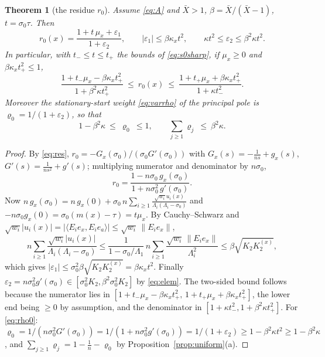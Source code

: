 \documentclass[11pt,a4paper]{article}
\newcommand{\ip}[2]{\langle #1,#2\rangle}
\newcommand{\Xb}{\bar X}
\theoremstyle{plain}
\newtheorem{theorem}{Theorem}[section]
\theoremstyle{definition}
\numberwithin{equation}{section}
\begin{document}
\begin{theorem}[the residue $r_0$]\label{thm:r0}
Assume \eqref{eq:A} and $\Xb>1$, $\beta=\Xb/(\Xb-1)$, $t=\sigma_0\tau$. Then
\begin{equation}\label{eq:r0}
r_0(x)=\frac{1+t\,\mu_x+\varepsilon_1}{1+\varepsilon_2},\qquad|\varepsilon_1|\le\beta\kappa_xt^2,\qquad\kappa t^2\le\varepsilon_2\le\beta^2\kappa t^2 .
\end{equation}
In particular, with $t_-\le t\le t_+$ the bounds of \eqref{eq:s0sharp}, if $\mu_x\ge0$ and $\beta\kappa_xt_+^2\le1$,
\[
\frac{1+t_-\mu_x-\beta\kappa_xt_+^2}{1+\beta^2\kappa t_+^2}\ \le\ r_0(x)\ \le\ \frac{1+t_+\mu_x+\beta\kappa_xt_+^2}{1+\kappa t_-^2} .
\]
Moreover the stationary-start weight \eqref{eq:varrho} of the principal pole is $\varrho_0=1/(1+\varepsilon_2)$, so that
\begin{equation}\label{eq:rho0}
1-\beta^2\kappa\ \le\ \varrho_0\ \le 1,\qquad \sum_{j\ge1}\varrho_j\ \le\ \beta^2\kappa .
\end{equation}
\end{theorem}
\begin{proof}
By \eqref{eq:res}, $r_0=-G_x(\sigma_0)/(\sigma_0G'(\sigma_0))$ with $G_x(s)=-\frac1{ns}+g_x(s)$, $G'(s)=\frac1{ns^2}+g'(s)$; multiplying numerator and denominator by $n\sigma_0$,
\[
r_0=\frac{1-n\sigma_0\,g_x(\sigma_0)}{1+n\sigma_0^2\,g'(\sigma_0)} .
\]
Now $n\,g_x(\sigma_0)=n\,g_x(0)+\sigma_0\,n\sum_{i\ge1}\frac{\sqrt{w_i}u_i(x)}{\Lambda_i(\Lambda_i-\sigma_0)}$ and $-n\sigma_0g_x(0)=\sigma_0(m(x)-\tau)=t\mu_x$. By Cauchy--Schwarz and $\sqrt{w_i}|u_i(x)|=|\ip{E_ie_x}{E_ie_a}|\le\sqrt{w_i}\,\|E_ie_x\|$,
\[
n\sum_{i\ge1}\frac{\sqrt{w_i}|u_i(x)|}{\Lambda_i(\Lambda_i-\sigma_0)}\le\frac1{1-\sigma_0/\Lambda_1}\,n\sum_{i\ge1}\frac{\sqrt{w_i}\,\|E_ie_x\|}{\Lambda_i^2}\le\beta\sqrt{K_2K_2^{(x)}},
\]
which gives $|\varepsilon_1|\le\sigma_0^2\beta\sqrt{K_2K_2^{(x)}}=\beta\kappa_xt^2$. Finally $\varepsilon_2=n\sigma_0^2g'(\sigma_0)\in[\sigma_0^2K_2,\beta^2\sigma_0^2K_2]$ by \eqref{eq:elem}. The two-sided bound follows because the numerator lies in $[1+t_-\mu_x-\beta\kappa_xt_+^2,\,1+t_+\mu_x+\beta\kappa_xt_+^2]$, the lower end being $\ge0$ by assumption, and the denominator in $[1+\kappa t_-^2,1+\beta^2\kappa t_+^2]$. For \eqref{eq:rho0}: $\varrho_0=1/(n\sigma_0^2G'(\sigma_0))=1/(1+n\sigma_0^2g'(\sigma_0))=1/(1+\varepsilon_2)\ge1-\beta^2\kappa t^2\ge1-\beta^2\kappa$, and $\sum_{j\ge1}\varrho_j=1-\frac1n-\varrho_0$ by Proposition~\ref{prop:uniform}(a).
\end{proof}
\end{document}
